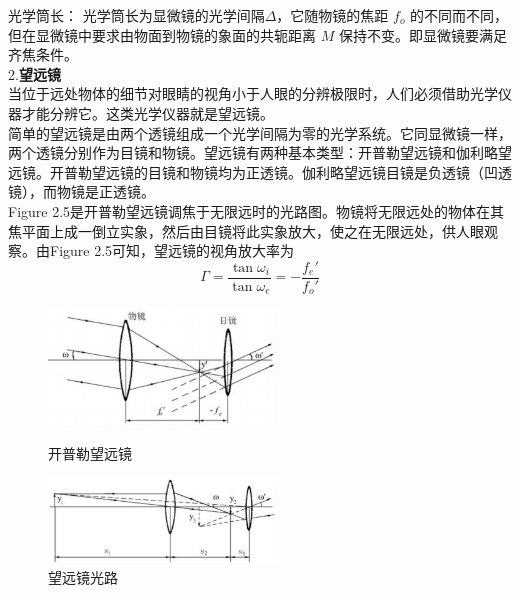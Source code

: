 \documentclass{article}
\begin{document}
光学筒长：  光学筒长为显微镜的光学间隔\(\Delta\)，它随物镜的焦距 \(f_{o}\) 的不同而不同，但在显微镜中要求由物面到物镜的象面的共轭距离 \(M\) 保持不变。即显微镜要满足齐焦条件。\\
2.\textbf{望远镜}\\
\hspace*{2em}当位于远处物体的细节对眼睛的视角小于人眼的分辨极限时，人们必须借助光学仪器才能分辨它。这类光学仪器就是望远镜。\\
\hspace*{2em}简单的望远镜是由两个透镜组成一个光学间隔为零的光学系统。它同显微镜一样，两个透镜分别作为目镜和物镜。望远镜有两种基本类型：开普勒望远镜和伽利略望远镜。开普勒望远镜的目镜和物镜均为正透镜。伽利略望远镜目镜是负透镜（凹透镜），而物镜是正透镜。\\
\hspace*{2em}Figure 2.5是开普勒望远镜调焦于无限远时的光路图。物镜将无限远处的物体在其焦平面上成一倒立实象，然后由目镜将此实象放大，使之在无限远处，供人眼观察。由Figure 2.5可知，望远镜的视角放大率为
\begin{equation}
    \Gamma=\frac{\tan \omega_i}{\tan \omega_e}=-\frac{f_e'}{f_o'}
\end{equation}
\begin{figure}[h]
    \centering
    \begin{minipage}{0.45\textwidth} %
        \centering
        \includegraphics[width=6cm]{2.2.3.png} %
        \caption{开普勒望远镜}
    \end{minipage}\hfill
    \centering
    \begin{minipage}{0.45\textwidth} %
        \centering
        \includegraphics[width=6cm]{2.2.4.png} %
        \caption{望远镜光路}
    \end{minipage}\hfill
\end{figure}
\\
\end{document}
